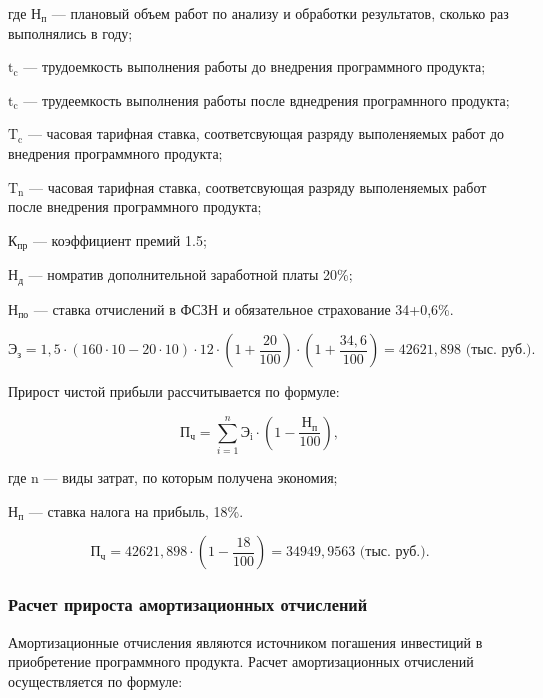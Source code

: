где \(\text{Н}_{\text{п}}\) --- плановый объем работ по анализу и обработки результатов, сколько раз выполнялись в году;

\(\text{t}_{\text{c}}\) --- трудоемкость выполнения работы до внедрения программного продукта; 

\(\text{t}_{\text{c}}\) --- трудеемкость выполнения работы после вднедрения програмнного продукта;

\(\text{T}_{\text{c}}\) --- часовая тарифная ставка, соответсвующая разряду выполеняемых работ до внедрения программного продукта;

\(\text{T}_{\text{n}}\) --- часовая тарифная ставка, соответсвующая разряду выполеняемых работ после внедрения программного продукта;

\(\text{К}_{\text{пр}}\) --- коэффициент премий 1.5; 

\(\text{Н}_{\text{д}}\) --- номратив дополнительной заработной платы 20\%;

\(\text{Н}_{\text{по}}\) --- ставка отчислений в ФСЗН и обязательное страхование 34+0,6\%. 

\begin{equation}
    \text{Э}_{\text{з}} = 1,5\cdot(160\cdot10-20\cdot10)\cdot12\cdot(1+\frac{20}{100})\cdot(1+\frac{34,6}{100}) = 42621,898 \text{ (тыс. руб.)}.
\end{equation}

Прирост чистой прибыли рассчитывается по формуле:

\begin{equation}
  \text{П}_{\text{ч}} = \sum\limits_{i=1}^n \text{Э}_{\text{i}}\cdot(1-\frac{\text{Н}_{\text{п}}}{100}),
\end{equation}

где \(\text{n}\) --- виды затрат, по которым получена экономия;

\(\text{Н}_{\text{п}}\) --- ставка налога на прибыль, 18\%.

\begin{equation}
    \text{П}_{\text{ч}} = 42621,898\cdot(1-\frac{18}{100}) = 34949,9563 \text{ (тыс. руб.)}.
\end{equation}

\subsubsection{Расчет прироста амортизационных отчислений}

Амортизационные отчисления являются источником погашения инвестиций в приобретение программного продукта. Расчет амортизационных отчислений осуществляется по формуле:

